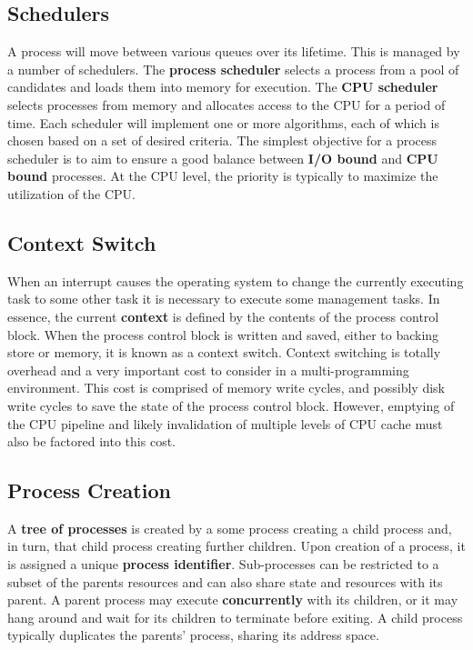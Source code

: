 \documentclass[10pt,a4paper]{article}
\begin{document}
\subsection{Schedulers}
A process will move between various queues over its lifetime. This is managed by a number of schedulers. The {\bf process scheduler} selects a process from a pool of candidates and loads them into memory for execution. The {\bf CPU scheduler} selects processes from memory and allocates access to the CPU for a period of time. Each scheduler will implement one or more algorithms, each of which is chosen based on a set of desired criteria. The simplest objective for a process scheduler is to aim to ensure a good balance between {\bf I/O bound} and {\bf CPU bound} processes. At the CPU level, the priority is typically to maximize the utilization of the CPU. 
\subsection{Context Switch}
When an interrupt causes the operating system to change the currently executing task to some other task it is necessary to execute some management tasks. In essence, the current {\bf context} is defined by the contents of the process control block. When the process control block is written and saved, either to backing store or memory, it is known as a context switch. Context switching is totally overhead and a very important cost to consider in a multi-programming environment. This cost is comprised of memory write cycles, and possibly disk write cycles to save the state of the process control block. However, emptying of the CPU pipeline and likely invalidation of multiple levels of CPU cache must also be factored into this cost. 
\subsection{Process Creation}
A {\bf tree of processes} is created by a some process creating a child process and, in turn, that child process creating further children. Upon creation of a process, it is assigned a unique {\bf process identifier}. Sub-processes can be restricted to a subset of the parents resources and can also share state and resources with its parent. A parent process may execute {\bf concurrently} with its children, or it may hang around and wait for its children to terminate before exiting. A child process typically duplicates the parents' process, sharing its address space. 
\newline\newline
\end{document}
